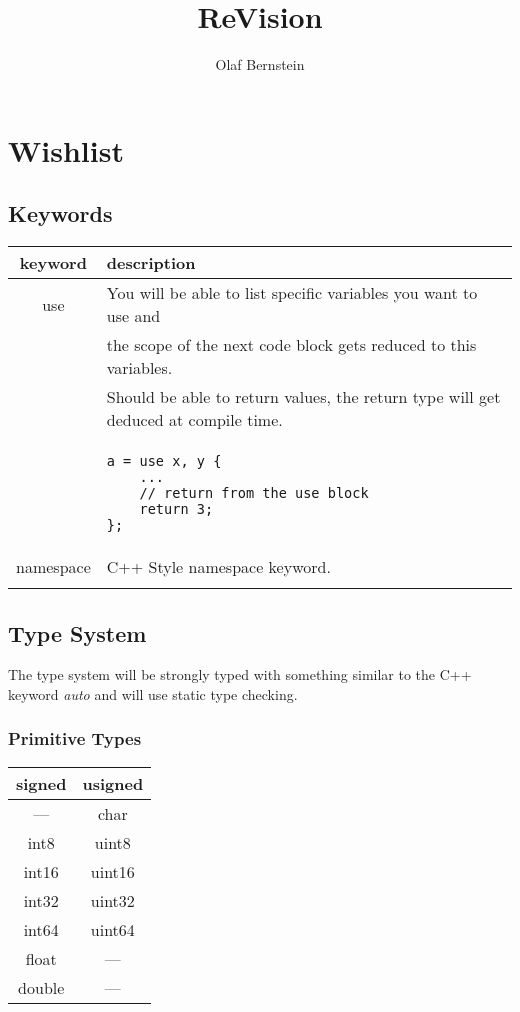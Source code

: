 \documentclass[10pt,a4paper]{article}
\author{Olaf Bernstein}
\title{ReVision}
\begin{document}
\maketitle
\tableofcontents

\section{Wishlist}


\subsection{Keywords}
\begin{tabular}{||c|l||}\hline
	keyword 	& description	\\ \hline \hline
 
  
	use 	 	& You will be able to list specific variables you want to use and \\
  				& the scope of the next code block gets reduced to this variables. \\
  				& Should be able to return values, the return type will get deduced at compile time. \\
&\begin{lstlisting} 
a = use x, y {
	...
	// return from the use block
  	return 3;
};
\end{lstlisting} \\


	namespace & C++ Style namespace keyword. \\
	\\\hline
\end{tabular}


\subsection{Type System}
The type system will be strongly typed with something similar to the C++ keyword \textit{auto} and will use static type checking.


\subsubsection{Primitive Types}
\begin{tabular}{||c|c||}\hline
	signed & usigned	\\ \hline \hline
	--- 	 & char		\\
	int8   & uint8		\\
	int16  & uint16		\\
	int32  & uint32		\\
	int64  & uint64		\\
	float  & ---		\\
	double & ---		\\
\hline
\end{tabular}
\end{document}
